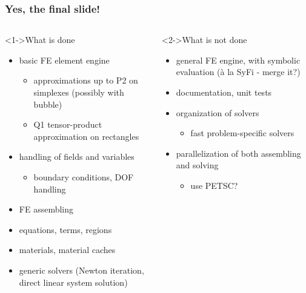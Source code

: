 \documentclass[10pt,t]{beamer}
\begin{document}
\begin{frame}
  \frametitle{Yes, the final slide!}
  \vspace*{-5mm}
  \begin{columns}[t]
    \begin{column}{0.52\linewidth}
      \begin{exampleblock}<1->{What is done}\
        \begin{itemize}
        \item basic FE element engine
          \begin{itemize}
          \item approximations up to P2 on simplexes (possibly with bubble)
          \item Q1 tensor-product approximation on rectangles
          \end{itemize}
        \item handling of fields and variables
          \begin{itemize}
          \item boundary conditions, DOF handling
          \end{itemize}
        \item FE assembling
        \item equations, terms, regions
        \item materials, material caches
        \item generic solvers (Newton iteration, direct linear system solution)
        \end{itemize}
      \end{exampleblock}
    \end{column}
    \begin{column}{0.55\linewidth}
      \begin{block}<2->{What is not done}
        \begin{itemize}
        \item general FE engine, with symbolic evaluation (\`a la SyFi - merge
          it?)
        \item documentation, unit tests
        \item organization of solvers
          \begin{itemize}
          \item fast problem-specific solvers
          \end{itemize}
        \item parallelization of both assembling and solving
          \begin{itemize}
          \item use PETSC?

\end{itemize}
\end{itemize}
\end{block}
\end{column}
\end{columns}
\end{frame}
\end{document}
